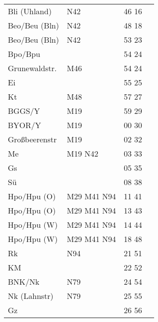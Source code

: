 \begin{tabular}{!{\color{schiefergrau}\vrule width 3pt}*{4}{l!{\color{schiefergrau}\vrule width 3pt}}}
Bli (Uhland) & \nbus{} N42                                 & 46 16 &       \\
Beo/Beu (Bln)& \nuneun{} \nbus{} N42                       & 48 18 &       \\
\hline
Beo/Beu (Bln)& \nuneun{} \nbus{} N42                       & 53 23 &       \\
Bpo/Bpu      &                                             & 54 24 &       \\
Grunewaldstr.& \mbus{} M46                                 & 54 24 &       \\
Ei           &                                             & 55 25 &       \\
Kt           & \mbus{} M48                                 & 57 27 &       \\
BGGS/Y       & \mbus{} M19                                 & 59 29 &       \\
BYOR/Y       & \mbus{} M19                                 & 00 30 &       \\
Großbeerenstr& \mbus{} M19                                 & 02 32 &       \\
Me           & \nusechs{} \mbus{} M19 \nbus{} N42          & 03 33 &       \\
Gs           &                                             & 05 35 &       \\
Sü           &                                             & 08 38 &       \\
Hpo/Hpu (O)  & \nuacht{} \mbus{} M29 M41 \nbus{} N94       & 11 41 &       \\
\hline
Hpo/Hpu (O)  & \nuacht{} \mbus{} M29 M41 \nbus{} N94       & 13 43 &       \\
Hpo/Hpu (W)  & \nuacht{} \mbus{} M29 M41 \nbus{} N94       & 14 44 &       \\
\hline
Hpo/Hpu (W)  & \nuacht{} \mbus{} M29 M41 \nbus{} N94       & 18 48 &       \\
Rk           & \nbus{} N94                                 & 21 51 &       \\
KM           &                                             & 22 52 &       \\
BNK/Nk       & \nbus{} N79                                 & 24 54 &       \\
Nk (Lahnstr) & \nbus{} N79                                 & 25 55 &       \\
Gz           &                                             & 26 56 &       \\

\end{tabular}
